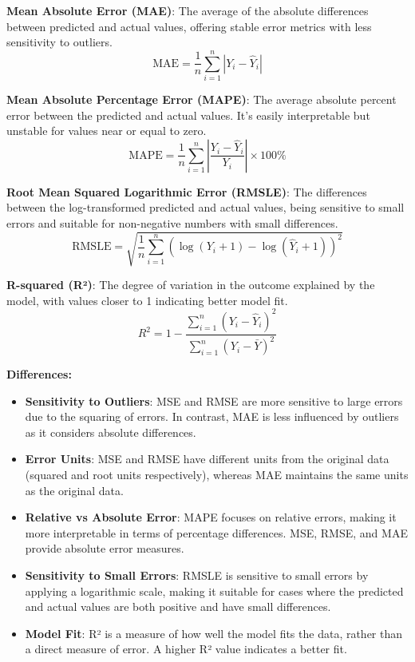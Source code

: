 \documentclass[10pt,twocolumn,letterpaper]{article}
\begin{document}
\textbf{Mean Absolute Error (MAE)}: The average of the absolute differences between predicted and actual values, offering stable error metrics with less sensitivity to outliers.
\begin{equation}
    \text{MAE} = \frac{1}{n} \sum_{i=1}^{n} |Y_i - \hat{Y}_i|
\end{equation}

\textbf{Mean Absolute Percentage Error (MAPE)}: The average absolute percent error between the predicted and actual values. It's easily interpretable but unstable for values near or equal to zero.
\begin{equation}
    \text{MAPE} = \frac{1}{n} \sum_{i=1}^{n} \left|\frac{Y_i - \hat{Y}_i}{Y_i}\right| \times 100\%
\end{equation}

\textbf{Root Mean Squared Logarithmic Error (RMSLE)}: The differences between the log-transformed predicted and actual values, being sensitive to small errors and suitable for non-negative numbers with small differences.
\begin{equation}
    \text{RMSLE} = \sqrt{\frac{1}{n} \sum_{i=1}^{n} (\log(Y_i + 1) - \log(\hat{Y}_i + 1))^2}
\end{equation}

\textbf{R-squared (R²)}: The degree of variation in the outcome explained by the model, with values closer to 1 indicating better model fit.
\begin{equation}
    R^2 = 1 - \frac{\sum_{i=1}^{n} (Y_i - \hat{Y}_i)^2}{\sum_{i=1}^{n} (Y_i - \bar{Y})^2}
\end{equation}

\textbf{Differences:}
\begin{itemize}
    \item \textbf{Sensitivity to Outliers}: MSE and RMSE are more sensitive to large errors due to the squaring of errors. In contrast, MAE is less influenced by outliers as it considers absolute differences.
    \item \textbf{Error Units}: MSE and RMSE have different units from the original data (squared and root units respectively), whereas MAE maintains the same units as the original data.
    \item \textbf{Relative vs Absolute Error}: MAPE focuses on relative errors, making it more interpretable in terms of percentage differences. MSE, RMSE, and MAE provide absolute error measures.
    \item \textbf{Sensitivity to Small Errors}: RMSLE is sensitive to small errors by applying a logarithmic scale, making it suitable for cases where the predicted and actual values are both positive and have small differences.
    \item \textbf{Model Fit}: R² is a measure of how well the model fits the data, rather than a direct measure of error. A higher R² value indicates a better fit.
\end{itemize}
\end{document}
